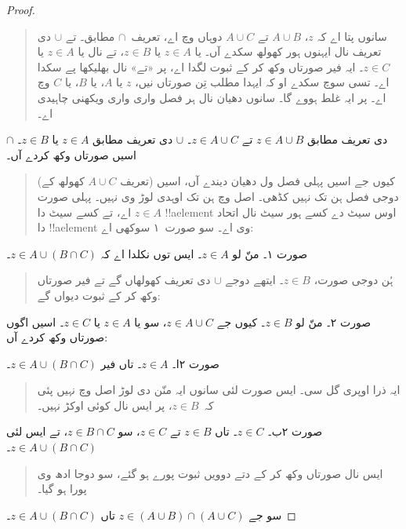 \documentclass[../../../include/open-logic-section]{subfiles}
\begin{document}
\begin{proof}
\begin{quote}
سانوں پتا اے کہ $z$، $A \cup B$ تے $A \cup C$ دوہاں وچ اے، تعریف~$\cap$ مطابق۔ تے $\cup$ دی تعریف نال ایہنوں ہور کھولھ سکدے آں۔ یا $z \in A$ یا $z \in B$، تے نال یا $z \in A$ یا $z \in
C$۔ ایہ فیر صورتاں وکھ کر کے ثبوت لگدا اے، پر «تے» نال بھلیکھا پے سکدا اے۔ تسی سوچ سکدے او کہ ایہدا مطلب تِن صورتاں نیں، $z$ یا $A$، یا $B$، یا $C$ وچ اے۔ پر ایہ غلط ہووے گا۔ سانوں دھیان نال ہر فصل واری واری ویکھنی چاہیدی اے۔
\end{quote}
$\cap$ دی تعریف مطابق $z \in A \cup B$ تے $z \in A \cup C$۔ $\cup$ دی تعریف مطابق $z \in A$ یا $z \in B$۔ اسیں صورتاں وکھ کردے آں۔
\begin{quote}
کیوں جے اسیں پہلی فصل ول دھیان دیندے آں، اسیں (تعریف $A \cup C$ کھولھ کے) دوجی فصل ہن تک نہیں کڈھی۔ اصل وچ ہن تک اوہدی لوڑ وی نہیں۔ پہلی صورت $z \in A$ اے، تے کسے سیٹ دا !!a{element} اوس سیٹ دے کسے ہور سیٹ نال اتحاد دا !!a{element} وی اے۔ سو صورت~۱ سوکھی اے:
\end{quote}
صورت ۱۔ منّ لو $z \in A$۔ ایس توں نکلدا اے کہ $z \in A \cup (B \cap
C)$۔
\begin{quote}
ہُن دوجی صورت، $z \in B$۔ ایتھے دوجے $\cup$ دی تعریف کھولھاں گے تے فیر صورتاں وکھ کر کے ثبوت دیواں گے:
\end{quote}
صورت ۲۔ منّ لو $z \in B$۔ کیوں جے $z \in A \cup C$، سو یا $z \in
A$ یا $z \in C$۔ اسیں اگوں صورتاں وکھ کردے آں:

صورت ۲ا۔ $z \in A$۔ تاں فیر $z \in A \cup (B \cap C)$۔
\begin{quote}
ایہ ذرا اوپری گل سی۔ ایس صورت لئی سانوں ایہ منّن دی لوڑ اصل وچ نہیں پئی کہ~$z \in B$، پر ایس نال کوئی اوکڑ نہیں۔
\end{quote}
صورت ۲ب۔ $z \in C$۔ تاں $z \in B$ تے $z \in C$، سو $z \in B \cap C$، تے ایس لئی $z \in A \cup (B \cap C)$۔
\begin{quote}
ایس نال صورتاں وکھ کر کے دتے دوویں ثبوت پورے ہو گئے، سو دوجا ادھ وی پورا ہو گیا۔
\end{quote}
سو جے $z \in (A \cup B) \cap (A \cup C)$ تاں $z \in A \cup (B \cap C)$۔
\end{proof}
\end{document}
